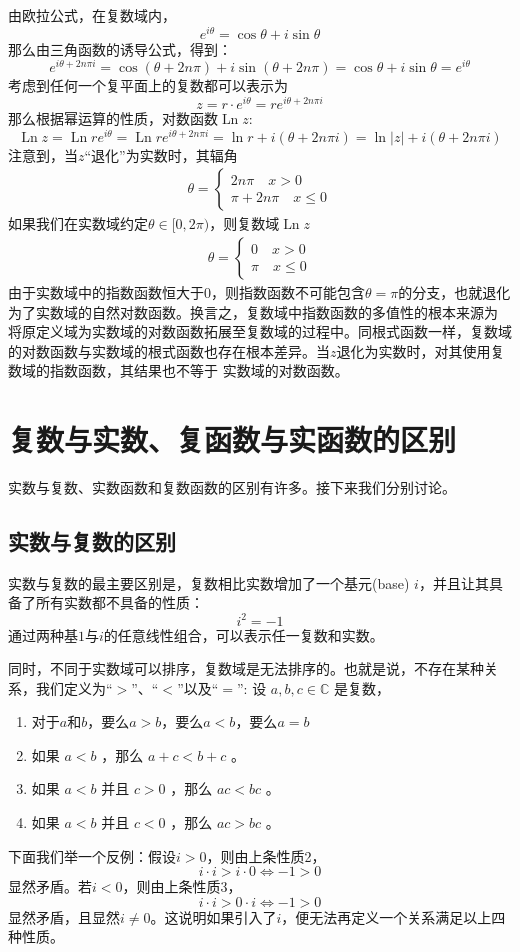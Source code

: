 \documentclass[12pt, a4paper, oneside]{ctexart}
\begin{document}
由欧拉公式，在复数域内，
$$
e^{i\theta}=\cos \theta + i \sin \theta
$$
那么由三角函数的诱导公式，得到：
$$
e^{i\theta+2n\pi i}=\cos (\theta+2n\pi) + i \sin (\theta+2n\pi)=\cos \theta + i \sin \theta=e^{i\theta}
$$
考虑到任何一个复平面上的复数都可以表示为
$$
z=r\cdot e^{i\theta}=re^{i\theta+2n\pi i}
$$
那么根据幂运算的性质，对数函数$\operatorname{Ln} z$:
$$
\operatorname{Ln} z = \operatorname{Ln} r  e^{i\theta} = \operatorname{Ln} r e^{i\theta + 2n\pi i} = \ln r + i(\theta+2n\pi i) = \ln |z| + i(\theta+2n\pi i)
$$
注意到，当$z$“退化”为实数时，其辐角
\begin{align*}
    \theta = 
    \begin{cases}
        2n\pi\quad x > 0\\
        \pi+2n\pi \quad x\le 0
    \end{cases}
\end{align*}
如果我们在实数域约定$\theta \in [0,2\pi)$，则复数域$\operatorname{Ln} z$
\begin{align*}
    \theta = 
    \begin{cases}
        0\quad x > 0\\
        \pi \quad x\le 0
    \end{cases}
\end{align*}
由于实数域中的指数函数恒大于0，则指数函数不可能包含$\theta=\pi$的分支，也就退化为了实数域的自然对数函数。换言之，复数域中指数函数的多值性的根本来源为
将原定义域为实数域的对数函数拓展至复数域的过程中。同根式函数一样，复数域的对数函数与实数域的根式函数也存在根本差异。当$z$退化为实数时，对其使用复数域的指数函数，其结果也不等于
实数域的对数函数。
\section{复数与实数、复函数与实函数的区别}
实数与复数、实数函数和复数函数的区别有许多。接下来我们分别讨论。
\subsection{实数与复数的区别}
实数与复数的最主要区别是，复数相比实数增加了一个基元(base) $i$，并且让其具备了所有实数都不具备的性质：
$$
i^2=-1
$$
通过两种基$1$与$i$的任意线性组合，可以表示任一复数和实数。

同时，不同于实数域可以排序，复数域是无法排序的。也就是说，不存在某种关系，我们定义为“$>$”、“$<$”以及“$=$”:
设 $a, b, c \in \mathbb{C}$ 是复数，
\begin{enumerate}
    \item 对于$a$和$b$，要么$a > b$，要么$a < b$，要么$a = b$
    \item 如果 $a < b$ ，那么 $a+c < b+c$ 。
    \item 如果 $a < b$ 并且 $c>0$ ，那么 $a c < b c$ 。
    \item 如果 $a < b$ 并且 $c<0$ ，那么 $a c > b c$ 。
\end{enumerate}
下面我们举一个反例：假设$i>0$，则由上条性质2，
$$
i\cdot i > i \cdot 0 \Leftrightarrow -1 > 0
$$
显然矛盾。若$i<0$，则由上条性质3，
$$
i \cdot i > 0 \cdot i \Leftrightarrow -1 >0
$$
显然矛盾，且显然$i\ne 0$。这说明如果引入了$i$，便无法再定义一个关系满足以上四种性质。
\end{document}
